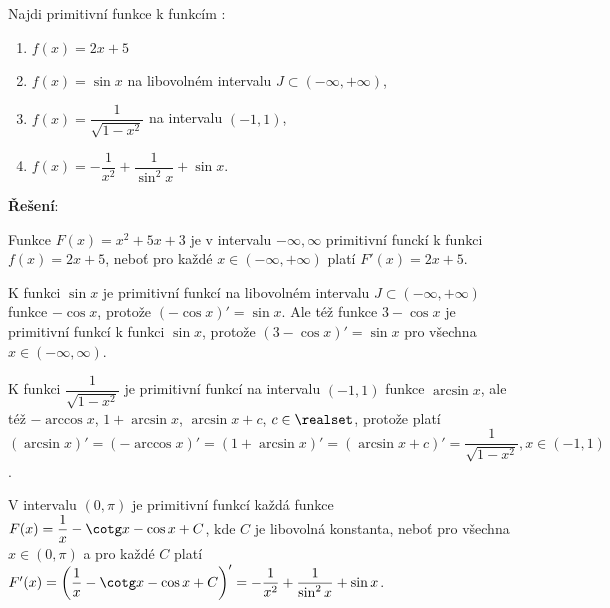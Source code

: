 \begin{mdframed}[style=mdexam]
  \begin{example}\label{mai:exam118}
    Najdi primitivní funkce k funkcím \cite[s.~254]{Brabec1989}:
    \begin{enumerate}
      \item \(f(x) = 2x+5\)
      \item \(f(x) = \sin x\) na libovolném intervalu \(J\subset(-\infty,+\infty)\),
      \item \(f(x) = \dfrac{1}{\sqrt{1-x^2}}\) na intervalu \((-1, 1)\),
      \item \(f(x) = -\dfrac{1}{x^2} + \dfrac{1}{\sin^2x} + \sin x\).
    \end{enumerate}
    \vspace{1em}
    \textbf{Řešení}:\newline

    Funkce \(F(x) = x^2+5x+3\) je v intervalu \(-\infty, \infty\) primitivní funckí k funkci \(f(x)
    = 2x+5\), neboť pro každé \(x\in(-\infty,+\infty)\) platí \(F'(x)=2x+5\).

    K funkci \(\sin x\) je primitivní funkcí na libovolném intervalu \(J\subset(-\infty,+\infty)\) 
    funkce \(-\cos x\), protože \((-\cos x)' = \sin x\). Ale též funkce \(3-\cos x\) je primitivní 
    funkcí k funkci \(\sin x\), protože \((3 - \cos x)' = \sin x\) pro všechna \(x\in(-\infty, 
    \infty)\).

    K funkci  \(\dfrac{1}{\sqrt{1-x^2}}\) je primitivní funkcí na intervalu \((-1, 1)\) funkce
    \(\arcsin x\), ale též \(-\arccos x\), \(1 + \arcsin x\), \(\arcsin x + c\), \(c\in\realset\),
    protože platí \((\arcsin x)' = (-\arccos x)' = (1+\arcsin x)' = (\arcsin x + c)' =
    \dfrac{1}{\sqrt{1-x^2}}, x\in(-1, 1)\).

    V intervalu \((0,\pi)\) je primitivní funkcí každá funkce \(F(x) = \dfrac{1}{x}-\cotg x - \cos x
    +C\), kde \(C\) je libovolná konstanta, neboť pro všechna \(x\in(0,\pi)\) a pro každé \(C\)
    platí \(F'(x) = \left(\dfrac{1}{x}-\cotg x -\cos x +C\right)'= -\dfrac{1}{x^2} +
    \dfrac{1}{\sin^2x} + \sin x\).
  \end{example}
\end{mdframed}